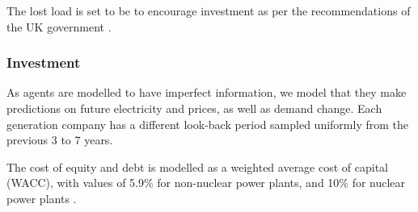 The lost load is set to be  to encourage investment as per the recommendations of the UK government \cite{DECC2013}.

\subsubsection{Investment}

As agents are modelled to have imperfect information, we model that they make predictions on future electricity and  prices, as well as demand change. Each generation company has a different look-back period sampled uniformly from the previous 3 to 7 years.


The cost of equity and debt is modelled as a weighted average cost of capital (WACC), with values of 5.9\% for non-nuclear power plants, and 10\% for nuclear power plants \cite{KPMG2017, Paper2012}. 





